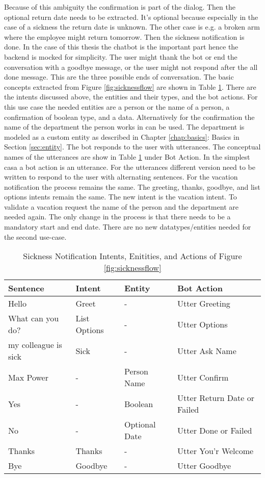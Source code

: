  Because of this ambiguity the confirmation is part of the dialog.
 Then the optional return date needs to be extracted.
 It's optional because especially in the case of a sickness the return date is unknown.
 The other case is e.g. a broken arm where the employee might return tomorrow.
 Then the sickness notification is done.
 In the case of this thesis the chatbot is the important part hence the backend is mocked for simplicity.
 The user might thank the bot or end the conversation with a goodbye message, or the user might not respond after the all done message.
 This are the three possible ends of conversation.
 The basic concepts extracted from Figure \ref{fig:sicknessflow} are shown in Table \ref{tab:sick_data}.
 There are the intents discussed above, the entities and their types, and the bot actions.
 For this use case the needed entities are a person or the name of a person, a confirmation of boolean type, and a data.
 Alternatively for the confirmation the name of the department the person works in can be used.
 The department is modeled as a custom entity as described in Chapter \ref{chap:basics}: Basics in Section \ref{sec:entity}.
 The bot responds to the user with utterances.
 The conceptual names of the utterances are show in Table \ref{tab:sick_data} under Bot Action.
 In the simplest casa a bot action is an utterance.
 For the utterances different version need to be written to respond to the user with alternating sentences.
 For the vacation notification the process remains the same.
 The greeting, thanks, goodbye, and list options intents remain the same.
 The new intent is the vacation intent.
 To validate a vacation request the name of the person and the department are needed again.
 The only change in the process is that there needs to be a mandatory start and end date.
 There are no new datatypes/entities needed for the second use-case.

 \begin{table}[h]
    \centering
    \begin{tabular}{ l | l | l | l }
        Sentence & Intent & Entity & Bot Action \\ \hline \hline
        Hello & Greet & - & Utter Greeting \\ \hline
        What can you do? & List Options & - & Utter Options \\ \hline
        my colleague is sick & Sick & - & Utter Ask Name \\ \hline
        Max Power & - & Person Name & Utter Confirm \\ \hline
        Yes & - & Boolean & Utter Return Date or Failed \\ \hline
        No & - & Optional Date & Utter Done or Failed \\ \hline
        Thanks & Thanks & - & Utter You'r Welcome \\ \hline
        Bye & Goodbye & - & Utter Goodbye 
    \end{tabular}
    \caption{Sickness Notification Intents, Enitities, and Actions of Figure \ref{fig:sicknessflow}} \label{tab:sick_data}
\end{table} \noindent

